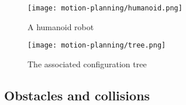 \begin{figure}[H]
    \centering

    \begin{minipage}{0.4\textwidth}
        \centering
        \texttt{[image: motion-planning/humanoid.png]}
        \caption*{A humanoid robot}
    \end{minipage}
    \begin{minipage}{0.5\textwidth}
        \centering
        \texttt{[image: motion-planning/tree.png]}
        \caption*{The associated configuration tree}
    \end{minipage}
\end{figure}

\subsection{Obstacles and collisions}

\newpage